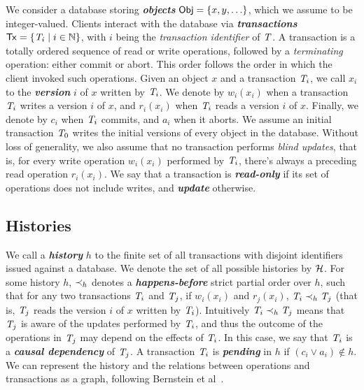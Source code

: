 We consider a database storing \textbf{\em objects} ${\sf Obj} = \{x, y, \ldots\}$, which we assume to be integer-valued. Clients interact with the database via \textbf{\em transactions} ${\sf Tx} = \{\mathit{T}_i \mid i \in \mathbb{N}\}$, with $i$ being the \emph{transaction identifier} of $\mathit{T}$. A transaction is a totally ordered sequence of read or write operations, followed by a \emph{terminating} operation: either commit or abort. This order follows the order in which the client invoked such operations. Given an object $x$ and a transaction $\mathit{T}_i$, we call $x_i$ to the \textbf{\em version} $i$ of $x$ written by $\mathit{T}_i$. We denote by $w_i(x_i)$ when a transaction $\mathit{T}_i$ writes a version $i$ of $x$, and $r_i(x_i)$ when $\mathit{T}_i$ reads a version $i$ of $x$. Finally, we denote by $c_i$ when $\mathit{T}_i$ commits, and $a_i$ when it aborts. We assume an initial transaction $\mathit{T}_0$ writes the initial versions of every object in the database. Without loss of generality, we also assume that no transaction performs \emph{blind updates}, that is, for every write operation $w_i(x_i)$ performed by $\mathit{T}_i$, there's always a preceding read operation $r_i(x_i)$. We say that a transaction is \textbf{\em read-only} if its set of operations does not include writes, and \textbf{\em update} otherwise.

\subsection{Histories}
\label{sect:histories}

We call a \textbf{\em history} $h$ to the finite set of all transactions with disjoint identifiers issued against a database. We denote the set of all possible histories by $\mathcal{H}$. For some history $h$, $\prec_h$ denotes a \textbf{\em happens-before} strict partial order over $h$, such that for any two transactions $\mathit{T}_i$ and $\mathit{T}_j$, if $w_i(x_i)$ and $r_j(x_i)$, $\mathit{T}_i \prec_h \mathit{T}_j$ (that is, $\mathit{T}_j$ reads the version $i$ of $x$ written by $\mathit{T}_i$). Intuitively $\mathit{T}_i \prec_h \mathit{T}_j$ means that $\mathit{T}_j$ is aware of the updates performed by $\mathit{T}_i$, and thus the outcome of the operations in $\mathit{T}_j$ may depend on the effects of $\mathit{T}_i$. In this case, we say that $\mathit{T}_i$ is a \textbf{\em causal dependency} of $\mathit{T}_j$. A transaction $\mathit{T}_i$ is \textbf{\em pending} in $h$ if $(c_i \vee a_i) \notin h$. We can represent the history and the relations between operations and transactions as a graph, following Bernstein et al~\citep{bernstein_concurrency}.

